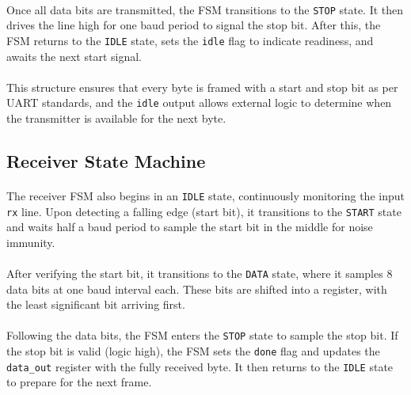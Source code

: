 \documentclass[12pt]{report}
\begin{document}
\paragraph{}
Once all data bits are transmitted, the FSM transitions to the \texttt{STOP} state. It then drives the line high for one baud period to signal the stop bit. After this, the FSM returns to the \texttt{IDLE} state, sets the \texttt{idle} flag to indicate readiness, and awaits the next start signal.

\paragraph{}
This structure ensures that every byte is framed with a start and stop bit as per UART standards, and the \texttt{idle} output allows external logic to determine when the transmitter is available for the next byte.

\subsection{Receiver State Machine}

\paragraph{}
The receiver FSM also begins in an \texttt{IDLE} state, continuously monitoring the input \texttt{rx} line. Upon detecting a falling edge (start bit), it transitions to the \texttt{START} state and waits half a baud period to sample the start bit in the middle for noise immunity.

\paragraph{}
After verifying the start bit, it transitions to the \texttt{DATA} state, where it samples 8 data bits at one baud interval each. These bits are shifted into a register, with the least significant bit arriving first.

\paragraph{}
Following the data bits, the FSM enters the \texttt{STOP} state to sample the stop bit. If the stop bit is valid (logic high), the FSM sets the \texttt{done} flag and updates the \texttt{data\_out} register with the fully received byte. It then returns to the \texttt{IDLE} state to prepare for the next frame.
\end{document}
